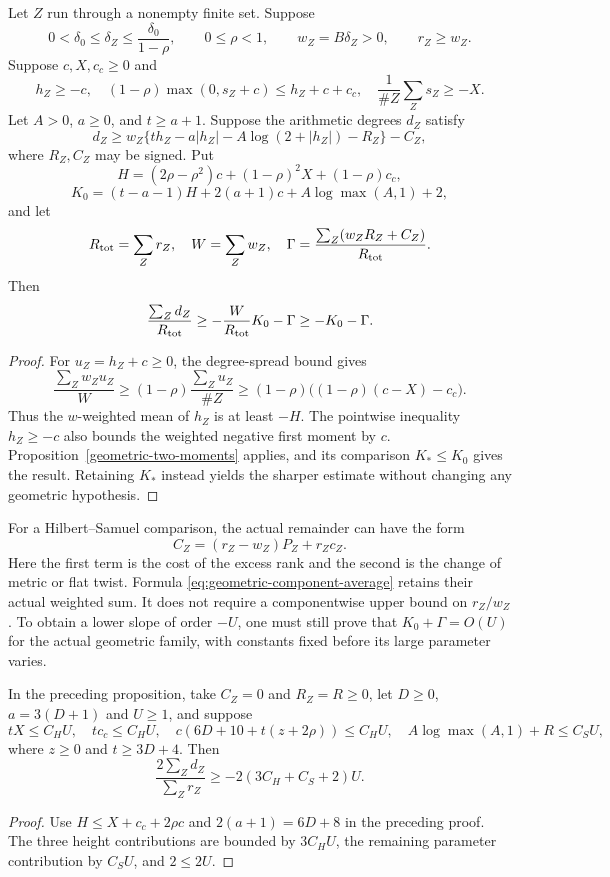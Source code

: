 \begin{proposition}\label{prop:geometric-component-average}
Let $Z$ run through a nonempty finite set. Suppose
\[
 0<\delta_0\le\delta_Z\le\frac{\delta_0}{1-\rho},\qquad
 0\le\rho<1,\qquad w_Z=B\delta_Z>0,\qquad r_Z\ge w_Z.
\]
Suppose $c,X,c_c\ge0$ and
\[
 h_Z\ge-c,\quad
 (1-\rho)\max(0,s_Z+c)\le h_Z+c+c_c,\quad
 \frac1{\#Z}\sum_Zs_Z\ge-X.
\]
Let $A>0$, $a\ge0$, and $t\ge a+1$. Suppose the arithmetic degrees
$d_Z$ satisfy
\[
 d_Z\ge w_Z\{t h_Z-a|h_Z|-A\log(2+|h_Z|)-R_Z\}-C_Z,
\]
where $R_Z,C_Z$ may be signed. Put
\[
 H=(2\rho-\rho^2)c+(1-\rho)^2X+(1-\rho)c_c,
\]
\[
 K_0=(t-a-1)H+2(a+1)c+A\log\max(A,1)+2,
\]
and let
\[
 R_{\rm tot}=\sum_Zr_Z,\quad W=\sum_Zw_Z,\quad
 \Gamma=\frac{\sum_Z(w_ZR_Z+C_Z)}{R_{\rm tot}}.
\]
Then
\begin{equation}\label{eq:geometric-component-average}
 \frac{\sum_Zd_Z}{R_{\rm tot}}
 \ge-\frac{W}{R_{\rm tot}}K_0-\Gamma
 \ge-K_0-\Gamma.
\end{equation}
\end{proposition}
\begin{proof}
For $u_Z=h_Z+c\ge0$, the degree-spread bound gives
\[
 \frac{\sum_Zw_Zu_Z}{W}
 \ge(1-\rho)\frac{\sum_Zu_Z}{\#Z}
 \ge(1-\rho)\bigl((1-\rho)(c-X)-c_c\bigr).
\]
Thus the $w$-weighted mean of $h_Z$ is at least $-H$.
The pointwise inequality $h_Z\ge-c$ also bounds the weighted negative
first moment by $c$. Proposition~\ref{geometric-two-moments} applies,
and its comparison $K_*\le K_0$ gives the result. Retaining $K_*$
instead yields the sharper estimate without changing any geometric
hypothesis.
\end{proof}

For a Hilbert--Samuel comparison, the actual remainder can have the form
\[
 C_Z=(r_Z-w_Z)P_Z+r_Zc_Z.
\]
Here the first term is the cost of the excess rank and the second is
the change of metric or flat twist. Formula
\eqref{eq:geometric-component-average} retains their actual weighted
sum. It does not require a componentwise upper bound on $r_Z/w_Z$.
To obtain a lower slope of order $-U$, one must still prove that
$K_0+\Gamma=O(U)$ for the actual geometric family, with constants fixed
before its large parameter varies.

\begin{corollary}\label{cor:geometric-component-constant}
In the preceding proposition, take $C_Z=0$ and $R_Z=R\ge0$,
let $D\ge0$, $a=3(D+1)$ and $U\ge1$, and suppose
\[
 tX\le C_HU,\quad tc_c\le C_HU,\quad
 c(6D+10+t(z+2\rho))\le C_HU,
 \quad A\log\max(A,1)+R\le C_SU,
\]
where $z\ge0$ and $t\ge3D+4$. Then
\[
 \frac{2\sum_Zd_Z}{\sum_Zr_Z}\ge-2(3C_H+C_S+2)U.
\]
\end{corollary}
\begin{proof}
Use $H\le X+c_c+2\rho c$ and $2(a+1)=6D+8$ in the preceding
proof. The three height contributions are bounded by $3C_HU$,
the remaining parameter contribution by $C_SU$, and $2\le2U$.
\end{proof}

